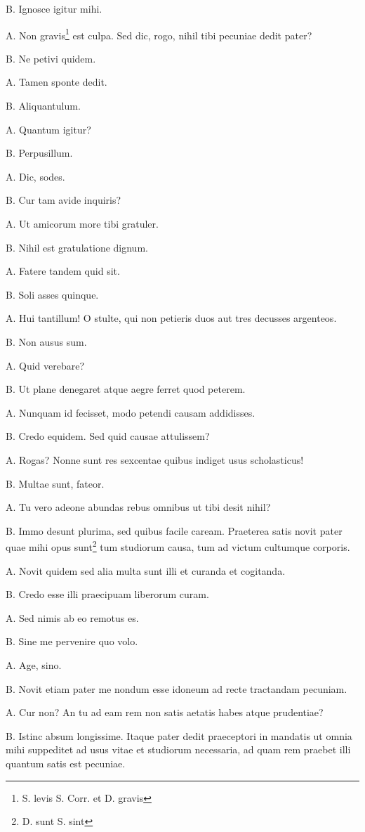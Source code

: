 \documentclass{article}
\begin{document}
B. Ignosce igitur mihi.

A. Non gravis\footnote{S. levis S. Corr. et  D. gravis} est culpa. Sed dic, rogo, nihil tibi pecuniae dedit pater?

B. Ne petivi quidem.

A. Tamen sponte dedit.

B. Aliquantulum.

A. Quantum igitur?

B. Perpusillum.

A. Dic, sodes.

B. Cur tam avide inquiris?

A. Ut amicorum more tibi gratuler.

B. Nihil est gratulatione dignum.

A. Fatere tandem quid sit.

B. Soli asses quinque.

A. Hui tantillum! O stulte, qui non petieris duos aut tres decusses argenteos.

B. Non ausus sum.

A. Quid verebare?

B. Ut plane denegaret atque aegre ferret quod peterem.

A. Nunquam id fecisset, modo petendi causam addidisses.

B. Credo equidem. Sed quid causae attulissem?

A. Rogas? Nonne sunt res sexcentae quibus indiget usus scholasticus!

B. Multae sunt, fateor.

A. Tu vero adeone abundas rebus omnibus ut tibi desit nihil?

B. Immo desunt plurima, sed quibus facile caream. Praeterea satis novit pater quae mihi opus sunt\footnote{D. sunt S. sint} tum studiorum causa, tum ad victum cultumque corporis.

A. Novit quidem sed alia multa sunt illi et curanda et cogitanda.

B. Credo esse illi praecipuam liberorum curam.

A. Sed nimis ab eo remotus es.

B. Sine me pervenire quo volo.

A. Age, sino.

B. Novit etiam pater me nondum esse idoneum ad recte tractandam pecuniam.

A. Cur non? An tu ad eam rem non satis aetatis habes atque prudentiae?

B. Istinc absum longissime. Itaque pater dedit praeceptori in mandatis ut omnia mihi suppeditet ad usus vitae et studiorum necessaria, ad quam rem praebet illi quantum satis est pecuniae.
\end{document}
